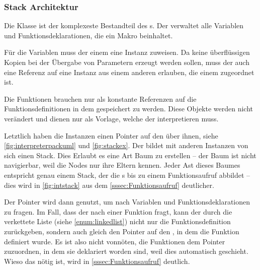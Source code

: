     \subsubsection{Stack Architektur}
    \label{sssec:Stack Architektur}
      Die  Klasse ist der komplexeste Bestandteil des s. Der  verwaltet alle Variablen und Funktionsdeklarationen, die ein Makro beinhaltet.

      Für die Variablen muss der  einem  eine  Instanz zuweisen. Da keine überflüssigen Kopien bei der Übergabe von Parametern erzeugt werden sollen, muss der  auch eine Referenz auf eine  Instanz aus einem anderen  erlauben, die einem  zugeordnet ist.

      Die Funktionen brauchen nur als konstante Referenzen auf die Funktionsdefinitionen in dem  gespeichert zu werden. Diese Objekte werden nicht verändert und dienen nur als Vorlage, welche der  interpretieren muss.

      Letztlich haben die  Instanzen einen Pointer auf den  über ihnen, siehe \autoref{fig:interpreterpackuml} und \autoref{fig:stackex}. Der  bildet mit anderen Instanzen von sich einen Stack. Dies Erlaubt es eine Art Baum zu erstellen -- der Baum ist nicht navigierbar, weil die Nodes nur ihre Eltern kennen. Jeder Ast dieses Baumes entspricht genau einem Stack, der die s bis zu einem Funktionsaufruf abbildet -- dies wird in \autoref{fig:intstack} aus dem \autoref{sssec:Funktionsaufruf} deutlicher.

      Der Pointer wird dann genutzt, um nach Variablen und Funktionsdeklarationen zu fragen. Im Fall, dass der  nach einer Funktion fragt, kann der  durch die verkettete Liste (siehe \ref{enum:linkedlist}) nicht nur die Funktionsdefinition zurückgeben, sondern auch gleich den Pointer auf den , in dem die Funktion definiert wurde. Es ist also nicht vonnöten, die Funktionen dem  Pointer zuzuordnen, in dem sie deklariert worden sind, weil dies automatisch geschieht. Wieso das nötig ist, wird in \autoref{sssec:Funktionsaufruf} deutlich.

